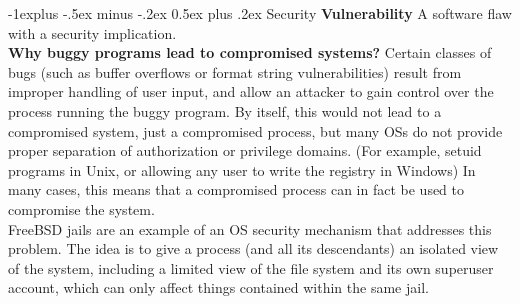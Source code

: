 \documentclass[9pt,landscape]{article}
\makeatletter
\renewcommand{\subsection}{\@startsection{subsection}{2}{0mm}%
                                {-1explus -.5ex minus -.2ex}%
                                {0.5ex plus .2ex}%
                                {\normalfont\normalsize\bfseries}}
\makeatother
\begin{document}
\begin{multicols}{3}
\subsection{Security}
{\bf Vulnerability} A software flaw with a security implication.\\
{\bf Why buggy programs lead to compromised systems?} 
Certain classes of bugs (such as buffer overflows or format string vulnerabilities) result from improper handling of user input, and allow an attacker to gain control over the process running the buggy program. By itself, this would not lead to a compromised system, just a compromised process, but many OSs do not provide proper separation of authorization or privilege domains. (For example, setuid programs in Unix, or allowing any user to write the registry in Windows) In many cases, this means that a compromised process can in fact be used to compromise the system.\\
FreeBSD jails are an example of an OS security mechanism that addresses this problem. The idea is to give a process (and all its descendants) an isolated view of the system, including a limited view of the file system and its own superuser account, which can only affect things contained within the same jail.\\

\scriptsize


\end{multicols}
\end{document}
